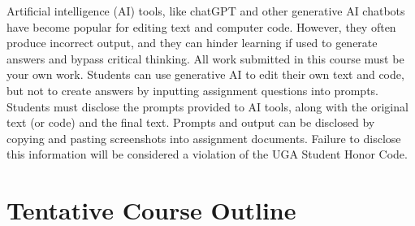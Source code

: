\documentclass[12pt]{article}
\begin{document}
Artificial intelligence (AI) tools, like chatGPT and other generative AI
chatbots have become popular for editing text and computer code. However,
they often produce incorrect output, and they can hinder learning if
used to generate answers and bypass critical thinking. All work
submitted in this course must be your own work. Students can use
generative AI to edit their own text and code, but not to create
answers by inputting assignment questions into prompts. Students must
disclose the prompts provided to  AI tools, along with the original
text (or code) and the final text. Prompts and output can be disclosed
by copying and pasting screenshots into assignment documents. Failure
to disclose this information will be considered a violation of the UGA
Student Honor Code. 


\clearpage

\section*{\normalsize Tentative Course Outline}
\end{document}
